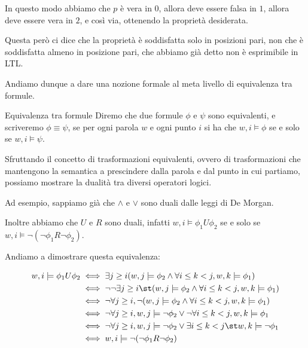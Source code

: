 In questo modo abbiamo che \(p\) è vera in \(0\), allora deve essere falsa in \(1\), allora deve essere vera in \(2\), e così via, ottenendo la proprietà desiderata.

Questa però ci dice che la proprietà è soddisfatta solo in posizioni pari, non che è soddisfatta almeno in posizione pari, che abbiamo già detto non è esprimibile in LTL\@.

Andiamo dunque a dare una nozione formale al meta livello di equivalenza tra formule.

\begin{definition}{Equivalenza tra formule}
  Diremo che due formule \(\phi\) e \(\psi\) sono equivalenti, e scriveremo \(\phi \equiv \psi\), se per ogni parola \(w\) e ogni punto \(i\) si ha che \(w,i \models \phi\) se e solo se \(w,i \models \psi\).
\end{definition}

Sfruttando il concetto di trasformazioni equivalenti, ovvero di trasformazioni che mantengono la semantica a prescindere dalla parola e dal punto in cui partiamo, possiamo mostrare la dualità tra diversi operatori logici.

Ad esempio, sappiamo già che \(\land\) e \(\lor\) sono duali dalle leggi di De Morgan.

Inoltre abbiamo che \(U\) e \(R\) sono duali, infatti \(w,i \models \phi_1 U \phi_2\) se e solo se \(w,i \models \neg (\neg \phi_1 R \neg \phi_2)\).

Andiamo a dimostrare questa equivalenza:

\begin{equation*}
  \begin{aligned}
    w,i\models \phi_1 U \phi_2 & \iff \exists j \geq i( w,j \models \phi_2 \land \forall i\leq k < j, w,k\models \phi_1)                 \\
                               & \iff \neg \neg \exists j \geq i\st( w,j \models \phi_2 \land \forall i\leq k < j, w,k\models \phi_1)    \\
                               & \iff \neg \forall j \geq i,\neg( w,j \models \phi_2 \land \forall i\leq k < j, w,k\models \phi_1)       \\
                               & \iff \neg \forall j \geq i, w,j \models \neg \phi_2 \lor \neg \forall i\leq k < j, w,k\models \phi_1    \\
                               & \iff \neg \forall j \geq i, w,j \models \neg \phi_2 \lor \exists i \leq k < j\st w,k\models \neg \phi_1 \\
                               & \iff w,i \models \neg (\neg \phi_1 R \neg \phi_2)
  \end{aligned}
\end{equation*}


